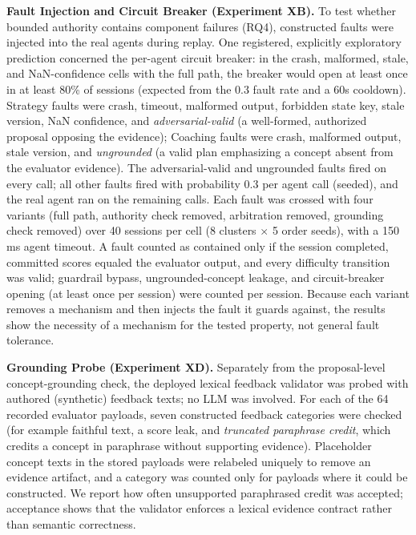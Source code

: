 \documentclass[runningheads]{llncs}
\begin{document}
\textbf{Fault Injection and Circuit Breaker (Experiment XB).} To test whether bounded authority contains component failures (RQ4), constructed faults were injected into the real agents during replay. One registered, explicitly exploratory prediction concerned the per-agent circuit breaker: in the crash, malformed, stale, and NaN-confidence cells with the full path, the breaker would open at least once in at least 80\% of sessions (expected from the 0.3 fault rate and a 60s cooldown). Strategy faults were crash, timeout, malformed output, forbidden state key, stale version, NaN confidence, and \emph{adversarial-valid} (a well-formed, authorized proposal opposing the evidence); Coaching faults were crash, malformed output, stale version, and \emph{ungrounded} (a valid plan emphasizing a concept absent from the evaluator evidence). The adversarial-valid and ungrounded faults fired on every call; all other faults fired with probability 0.3 per agent call (seeded), and the real agent ran on the remaining calls. Each fault was crossed with four variants (full path, authority check removed, arbitration removed, grounding check removed) over 40 sessions per cell (8 clusters $\times$ 5 order seeds), with a 150\,ms agent timeout. A fault counted as contained only if the session completed, committed scores equaled the evaluator output, and every difficulty transition was valid; guardrail bypass, ungrounded-concept leakage, and circuit-breaker opening (at least once per session) were counted per session. Because each variant removes a mechanism and then injects the fault it guards against, the results show the necessity of a mechanism for the tested property, not general fault tolerance.

\textbf{Grounding Probe (Experiment XD).} Separately from the proposal-level concept-grounding check, the deployed lexical feedback validator was probed with authored (synthetic) feedback texts; no LLM was involved. For each of the 64 recorded evaluator payloads, seven constructed feedback categories were checked (for example faithful text, a score leak, and \emph{truncated paraphrase credit}, which credits a concept in paraphrase without supporting evidence). Placeholder concept texts in the stored payloads were relabeled uniquely to remove an evidence artifact, and a category was counted only for payloads where it could be constructed. We report how often unsupported paraphrased credit was accepted; acceptance shows that the validator enforces a lexical evidence contract rather than semantic correctness.
\end{document}
